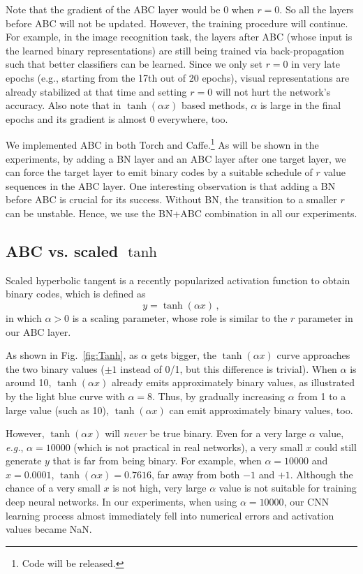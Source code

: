 \documentclass[runningheads]{llncs}
\begin{document}
Note that the gradient of the ABC layer would be $0$ when $r=0$. So all the layers before ABC will not be updated. However, the training procedure will continue. For example, in the image recognition task, the layers after ABC (whose input is the learned binary representations) are still being trained via back-propagation such that better classifiers can be learned. Since we only set $r=0$ in very late epochs (e.g., starting from the 17th out of 20 epochs), visual representations are already stabilized at that time and setting $r=0$ will not hurt the network's accuracy. Also note that in $\tanh(\alpha x)$ based methods, $\alpha$ is large in the final epochs and its gradient is almost 0 everywhere, too.

We implemented ABC in both Torch and Caffe.\footnote{Code will be released.} As will be shown in the experiments, by adding a BN layer and an ABC layer after one target layer, we can force the target layer to emit binary codes by a suitable schedule of $r$ value sequences in the ABC layer. One interesting observation is that adding a BN before ABC is crucial for its success. Without BN, the transition to a smaller $r$ can be unstable. Hence, we use the BN+ABC combination in all our experiments.

\subsection{ABC vs. scaled $\tanh$}

Scaled hyperbolic tangent is a recently popularized activation function to obtain binary codes, which is defined as
\begin{equation}
y = \tanh(\alpha x) \,,
\end{equation}
in which $\alpha>0$ is a scaling parameter, whose role is similar to the $r$ parameter in our ABC layer.

As shown in Fig.~\ref{fig:Tanh}, as $\alpha$ gets bigger, the $\tanh(\alpha x)$ curve approaches the two binary values ($\pm 1$ instead of 0/1, but this difference is trivial). When $\alpha$ is around 10, $\tanh(\alpha x)$ already emits approximately binary values, as illustrated by the light blue curve with $\alpha=8$. Thus, by gradually increasing $\alpha$ from 1 to a large value (such as 10), $\tanh(\alpha x)$ can emit approximately binary values, too.

However, $\tanh(\alpha x)$ will \emph{never} be true binary. Even for a very large $\alpha$ value, \emph{e.g.}, $\alpha=10000$ (which is not practical in real networks), a very small $x$ could still generate $y$ that is far from being binary. For example, when $\alpha=10000$ and $x=0.0001$, $\tanh(\alpha x)=0.7616$, far away from both $-1$ and $+1$. Although the chance of a very small $x$ is not high, very large $\alpha$ value is not suitable for training deep neural networks. In our experiments, when using $\alpha=10000$, our CNN learning process almost immediately fell into numerical errors and activation values became NaN.
\end{document}
